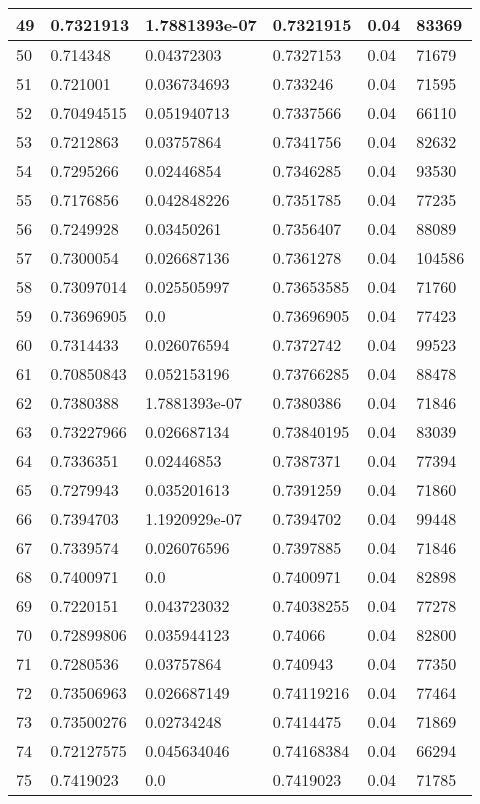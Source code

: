 \begin{longtable}{|l|l|l|l|l|l|}
49 & 0.7321913 & 1.7881393e-07 & 0.7321915 & 0.04 & 83369 \\ \hline 
50 & 0.714348 & 0.04372303 & 0.7327153 & 0.04 & 71679 \\ \hline 
51 & 0.721001 & 0.036734693 & 0.733246 & 0.04 & 71595 \\ \hline 
52 & 0.70494515 & 0.051940713 & 0.7337566 & 0.04 & 66110 \\ \hline 
53 & 0.7212863 & 0.03757864 & 0.7341756 & 0.04 & 82632 \\ \hline 
54 & 0.7295266 & 0.02446854 & 0.7346285 & 0.04 & 93530 \\ \hline 
55 & 0.7176856 & 0.042848226 & 0.7351785 & 0.04 & 77235 \\ \hline 
56 & 0.7249928 & 0.03450261 & 0.7356407 & 0.04 & 88089 \\ \hline 
57 & 0.7300054 & 0.026687136 & 0.7361278 & 0.04 & 104586 \\ \hline 
58 & 0.73097014 & 0.025505997 & 0.73653585 & 0.04 & 71760 \\ \hline 
59 & 0.73696905 & 0.0 & 0.73696905 & 0.04 & 77423 \\ \hline 
60 & 0.7314433 & 0.026076594 & 0.7372742 & 0.04 & 99523 \\ \hline 
61 & 0.70850843 & 0.052153196 & 0.73766285 & 0.04 & 88478 \\ \hline 
62 & 0.7380388 & 1.7881393e-07 & 0.7380386 & 0.04 & 71846 \\ \hline 
63 & 0.73227966 & 0.026687134 & 0.73840195 & 0.04 & 83039 \\ \hline 
64 & 0.7336351 & 0.02446853 & 0.7387371 & 0.04 & 77394 \\ \hline 
65 & 0.7279943 & 0.035201613 & 0.7391259 & 0.04 & 71860 \\ \hline 
66 & 0.7394703 & 1.1920929e-07 & 0.7394702 & 0.04 & 99448 \\ \hline 
67 & 0.7339574 & 0.026076596 & 0.7397885 & 0.04 & 71846 \\ \hline 
68 & 0.7400971 & 0.0 & 0.7400971 & 0.04 & 82898 \\ \hline 
69 & 0.7220151 & 0.043723032 & 0.74038255 & 0.04 & 77278 \\ \hline 
70 & 0.72899806 & 0.035944123 & 0.74066 & 0.04 & 82800 \\ \hline 
71 & 0.7280536 & 0.03757864 & 0.740943 & 0.04 & 77350 \\ \hline 
72 & 0.73506963 & 0.026687149 & 0.74119216 & 0.04 & 77464 \\ \hline 
73 & 0.73500276 & 0.02734248 & 0.7414475 & 0.04 & 71869 \\ \hline 
74 & 0.72127575 & 0.045634046 & 0.74168384 & 0.04 & 66294 \\ \hline 
75 & 0.7419023 & 0.0 & 0.7419023 & 0.04 & 71785 \\ \hline 
\end{longtable}